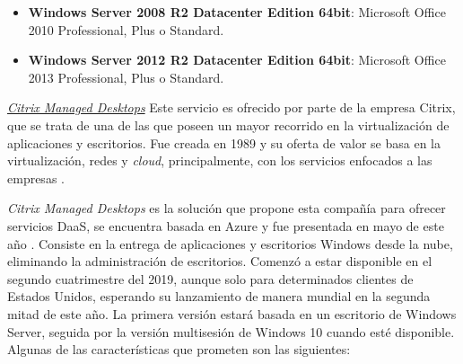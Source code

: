 \begin{itemize}
    \item \textbf{Windows Server 2008 R2 Datacenter Edition 64bit}: Microsoft Office 2010 Professional, Plus o Standard.
    
    \item \textbf{Windows Server 2012 R2 Datacenter Edition 64bit}: Microsoft Office 2013 Professional, Plus o Standard.
\end{itemize}

\clearpage

\noindent\underline{\textit{Citrix Managed Desktops}}\newline
\indent Este servicio es ofrecido por parte de la empresa Citrix, que se trata de una de las que poseen un mayor recorrido en la virtualización de aplicaciones y escritorios. Fue creada en 1989 y su oferta de valor se basa en la virtualización, redes y \textit{cloud}, principalmente, con los servicios enfocados a las empresas \cite{citrixabout}.

\textit{Citrix Managed Desktops} es la solución que propone esta compañía para ofrecer servicios \acs{DaaS}, se encuentra basada en Azure y fue presentada en mayo de este año \cite{kireetivalicherla2019}. Consiste en la entrega de aplicaciones y escritorios Windows desde la nube, eliminando la administración de escritorios. Comenzó a estar disponible en el segundo cuatrimestre del 2019, aunque solo para determinados clientes de Estados Unidos, esperando su lanzamiento de manera mundial en la segunda mitad de este año. La primera versión estará basada en un escritorio de Windows Server, seguida por la versión multisesión de Windows 10 cuando esté disponible. Algunas de las características que prometen son las siguientes:

